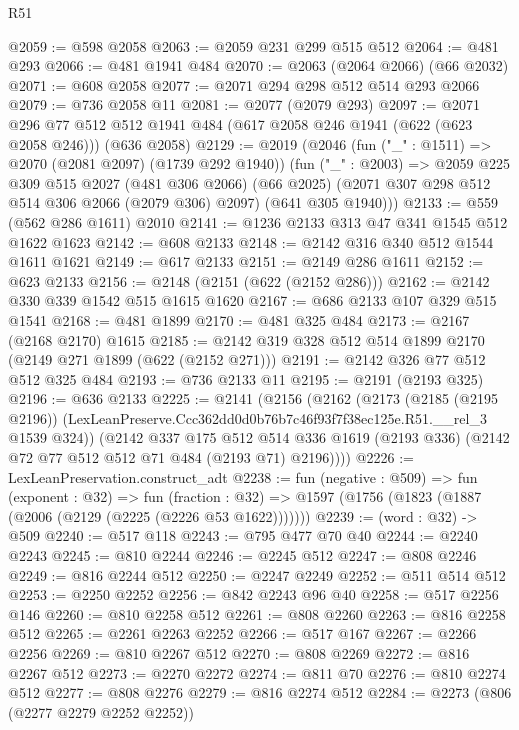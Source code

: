 \begin{lexlean}{R51}
\begin{coremodule}
@2059 := @598 @2058
@2063 := @2059 @231 @299 @515 @512
@2064 := @481 @293
@2066 := @481 @1941 @484
@2070 := @2063 (@2064 @2066) (@66 @2032)
@2071 := @608 @2058
@2077 := @2071 @294 @298 @512 @514 @293 @2066
@2079 := @736 @2058 @11
@2081 := @2077 (@2079 @293)
@2097 := @2071
    @296
    @77
    @512
    @512
    @1941
    @484
    (@617 @2058 @246 @1941 (@622 (@623 @2058 @246)))
    (@636 @2058)
@2129 := @2019
    (@2046
      (fun ("_" : @1511) => @2070 (@2081 @2097) (@1739 @292 @1940))
      (fun ("_" : @2003) =>
      @2059
        @225
        @309
        @515
        @2027
        (@481 @306 @2066)
        (@66 @2025)
        (@2071 @307 @298 @512 @514 @306 @2066 (@2079 @306) @2097)
        (@641 @305 @1940)))
@2133 := @559 (@562 @286 @1611) @2010
@2141 := @1236 @2133 @313 @47 @341 @1545 @512 @1622 @1623
@2142 := @608 @2133
@2148 := @2142 @316 @340 @512 @1544 @1611 @1621
@2149 := @617 @2133
@2151 := @2149 @286 @1611
@2152 := @623 @2133
@2156 := @2148 (@2151 (@622 (@2152 @286)))
@2162 := @2142 @330 @339 @1542 @515 @1615 @1620
@2167 := @686 @2133 @107 @329 @515 @1541
@2168 := @481 @1899
@2170 := @481 @325 @484
@2173 := @2167 (@2168 @2170) @1615
@2185 := @2142 @319 @328 @512 @514 @1899 @2170 (@2149 @271 @1899 (@622 (@2152 @271)))
@2191 := @2142 @326 @77 @512 @512 @325 @484
@2193 := @736 @2133 @11
@2195 := @2191 (@2193 @325)
@2196 := @636 @2133
@2225 := @2141
    (@2156
      (@2162
        (@2173
          (@2185 (@2195 @2196))
          (LexLeanPreserve.Ccc362dd0d0b76b7c46f93f7f38ec125e.R51.__rel_3 @1539 @324))
        (@2142
          @337
          @175
          @512
          @514
          @336
          @1619
          (@2193 @336)
          (@2142 @72 @77 @512 @512 @71 @484 (@2193 @71) @2196))))
@2226 := LexLeanPreservation.construct_adt
@2238 := fun (negative : @509) =>
  fun (exponent : @32) =>
  fun (fraction : @32) => @1597 (@1756 (@1823 (@1887 (@2006 (@2129 (@2225 (@2226 @53 @1622)))))))
@2239 := (word : @32) -> @509
@2240 := @517 @118
@2243 := @795 @477 @70 @40
@2244 := @2240 @2243
@2245 := @810 @2244
@2246 := @2245 @512
@2247 := @808 @2246
@2249 := @816 @2244 @512
@2250 := @2247 @2249
@2252 := @511 @514 @512
@2253 := @2250 @2252
@2256 := @842 @2243 @96 @40
@2258 := @517 @2256 @146
@2260 := @810 @2258 @512
@2261 := @808 @2260
@2263 := @816 @2258 @512
@2265 := @2261 @2263 @2252
@2266 := @517 @167
@2267 := @2266 @2256
@2269 := @810 @2267 @512
@2270 := @808 @2269
@2272 := @816 @2267 @512
@2273 := @2270 @2272
@2274 := @811 @70
@2276 := @810 @2274 @512
@2277 := @808 @2276
@2279 := @816 @2274 @512
@2284 := @2273 (@806 (@2277 @2279 @2252 @2252))

\end{coremodule}
\end{lexlean}
